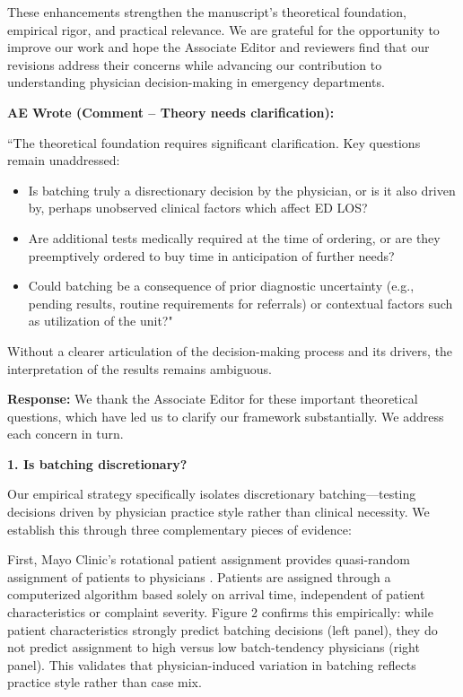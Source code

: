\documentclass[11pt]{article}
\newenvironment{quote2}
{ \bigskip
\noindent
         \small\em
         \baselineskip=14pt
}
\newcommand{\1}{\hbox{\rm 1\kern-.35em 1}}
\begin{document}
These enhancements strengthen the manuscript's theoretical foundation, empirical rigor, and practical relevance. We are grateful for the opportunity to improve our work and hope the Associate Editor and reviewers find that our revisions address their concerns while advancing our contribution to understanding physician decision-making in emergency departments.
\color{black}

\begin{quote2}
\textbf{AE Wrote (Comment – Theory needs clarification):}

\noindent ``The theoretical foundation requires significant clarification. Key questions remain unaddressed:
\begin{itemize}
 \item Is batching truly a disrectionary decision by the physician, or is it also driven by, perhaps unobserved clinical factors which affect ED LOS?
 \item Are additional tests medically required at the time of ordering, or are they preemptively ordered to buy time in anticipation of further needs?
 \item Could batching be a consequence of prior diagnostic uncertainty (e.g., pending results, routine requirements for referrals) or contextual factors such as utilization of the unit?"
\end{itemize}

Without a clearer articulation of the decision-making process and its drivers, the interpretation of the results remains ambiguous.

\end{quote2}

\noindent\textbf{Response:} \color{blue}We thank the Associate Editor for these important theoretical questions, which have led us to clarify our framework substantially. We address each concern in turn.

\textbf{1. Is batching discretionary?}

Our empirical strategy specifically isolates discretionary batching—testing decisions driven by physician practice style rather than clinical necessity. We establish this through three complementary pieces of evidence:

First, Mayo Clinic's rotational patient assignment provides quasi-random assignment of patients to physicians \citep{Traub2016, traub2016emergency, Traub2018}. Patients are assigned through a computerized algorithm based solely on arrival time, independent of patient characteristics or complaint severity. Figure 2 confirms this empirically: while patient characteristics strongly predict batching decisions (left panel), they do not predict assignment to high versus low batch-tendency physicians (right panel). This validates that physician-induced variation in batching reflects practice style rather than case mix.
\end{document}
